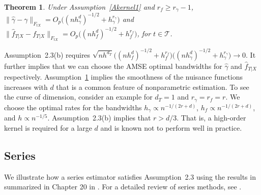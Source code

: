 \documentclass[lettersize, 12pt]{article}
\newtheorem{theorem}{Theorem}
\begin{document}
{\begin{theorem}
Under Assumption~\ref{Akernel1} and $r_f \geq r_\gamma-1$, 
$\|\hat\gamma - \gamma\|_{F_{tX}} = O_p\big((nh_\gamma^d)^{-1/2} + h_\gamma^{r_\gamma}\big)$
and 
$\|\hat f_{T|X} - f_{T|X}\|_{F_{tX}} = O_p\big((nh_f^d)^{-1/2} + h_f^{r_f} \big)$,
for $t\in\mathcal{T}$.
\label{Tkernel}
\end{theorem}


Assumption~2.3(b) requires $\sqrt{nh^{d_T}} 
\big((nh_f^{d} )^{-1/2}  + h_f^{r_f}\big) 
\big((nh_\gamma^d)^{-1/2} + h_\gamma^{r_\gamma}\big)
\rightarrow 0$.
It further implies that we can choose the AMSE optimal bandwidths for $\hat\gamma$ and $\hat f_{T|X}$ respectively.
Assumption~\ref{Tkernel} implies the smoothness of the nuisance functions increases with $d$
that is a common feature of nonparametric estimation. 
To see the curse of dimension, consider an example for $d_T = 1$ and $r_\gamma = r_f = r$.
We choose the optimal rates for the bandwidths 
$h_\gamma \propto n^{-1/(2r + d)}$, $h_f \propto n^{-1/(2r + d)}$, and $h \propto n^{-1/5}$.
Assumption~2.3(b) implies that $r > d/3$.
That is, a high-order kernel is required for a large $d$ and is known not to perform well in practice.



\subsection{Series}
\label{SecSeriesA}
We illustrate how a series estimator satisfies Assumption~2.3 using the results in \cite{Newey97JoE} summarized in Chapter 20 in \cite{HansenBook}.
For a detailed review of series methods, see \cite{Chen07}.

}
\end{document}
